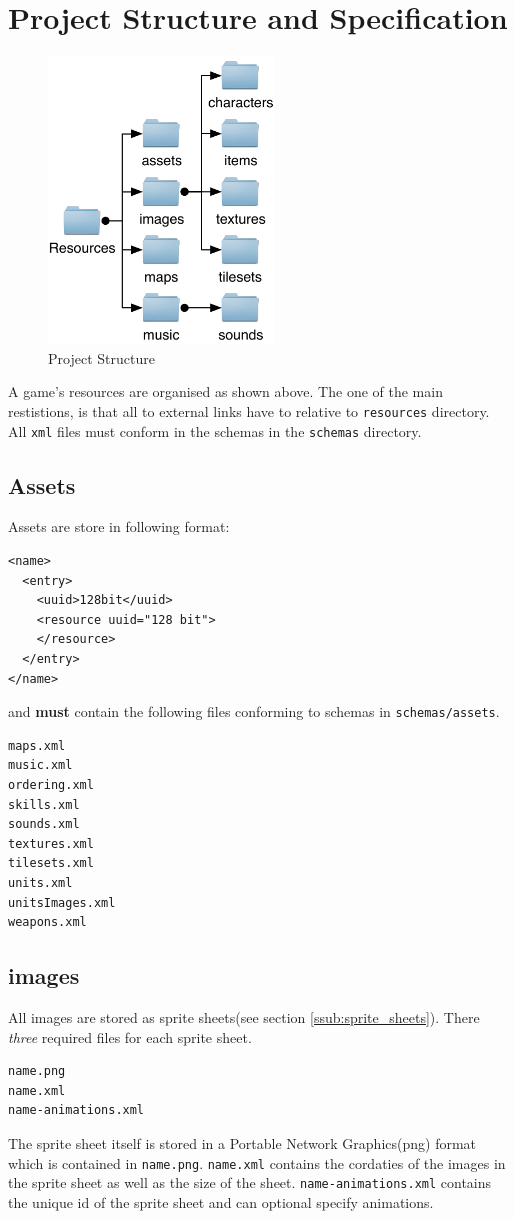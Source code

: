 \section{Project Structure and Specification}

\begin{figure}[htbp]
	\centering
		\includegraphics[height=3in]{figures/Files.pdf}
	\caption{Project Structure}
	\label{fig:figures_Files}
\end{figure}

A game's resources  are organised as shown above. The one of the main restistions, is that all to external links have to relative to \texttt{resources} directory. All \texttt{xml} files must conform in the schemas in the \texttt{schemas} directory. 

\subsection{Assets}
Assets are store in following format:
\begin{lstlisting}[caption=Assets format]
<name>
  <entry>
    <uuid>128bit</uuid>
    <resource uuid="128 bit">
    </resource>
  </entry>
</name>
\end{lstlisting}

and \textbf{must} contain the following files conforming to schemas in \texttt{schemas/assets}.
\begin{lstlisting}[caption=Required Assets]
maps.xml
music.xml
ordering.xml
skills.xml
sounds.xml
textures.xml
tilesets.xml
units.xml
unitsImages.xml
weapons.xml
\end{lstlisting}

\subsection{images}
All images are stored as sprite sheets(see section \ref{ssub:sprite_sheets}).  There \emph{three} required files for each sprite sheet. 
\begin{lstlisting}
name.png
name.xml
name-animations.xml
\end{lstlisting}
The sprite sheet itself is stored in a Portable Network Graphics(png) format which is contained in \texttt{name.png}. \texttt{name.xml} contains the cordaties of the images in the sprite sheet as well as the size of the sheet. \texttt{name-animations.xml} contains the unique id of the sprite sheet and can optional specify animations. 

